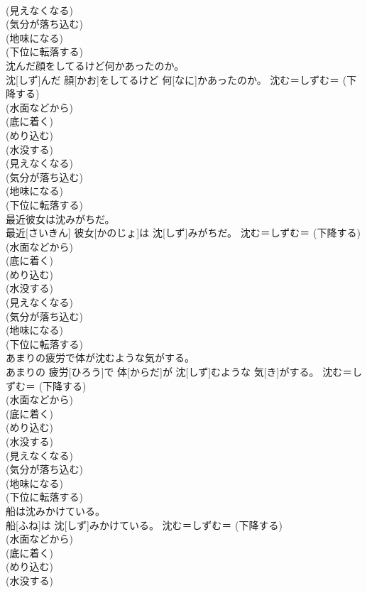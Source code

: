 \documentclass[8pt]{extreport}
\begin{document}
\begin{CJK}{UTF8}{min}
{\\	(見えなくなる) 
\\	(気分が落ち込む) 
\\	(地味になる) 
\\	(下位に転落する) 
\\	沈んだ顔をしてるけど何かあったのか。	
\\	沈[しず]んだ 顔[かお]をしてるけど 何[なに]かあったのか。	沈む＝しずむ＝ (下降する) 
\\	(水面などから) 
\\	(底に着く) 
\\	(めり込む) 
\\	(水没する) 
\\	(見えなくなる) 
\\	(気分が落ち込む) 
\\	(地味になる) 
\\	(下位に転落する) 
\\	最近彼女は沈みがちだ。	
\\	最近[さいきん] 彼女[かのじょ]は 沈[しず]みがちだ。	沈む＝しずむ＝ (下降する) 
\\	(水面などから) 
\\	(底に着く) 
\\	(めり込む) 
\\	(水没する) 
\\	(見えなくなる) 
\\	(気分が落ち込む) 
\\	(地味になる) 
\\	(下位に転落する) 
\\	あまりの疲労で体が沈むような気がする。	
\\	あまりの 疲労[ひろう]で 体[からだ]が 沈[しず]むような 気[き]がする。	沈む＝しずむ＝ (下降する) 
\\	(水面などから) 
\\	(底に着く) 
\\	(めり込む) 
\\	(水没する) 
\\	(見えなくなる) 
\\	(気分が落ち込む) 
\\	(地味になる) 
\\	(下位に転落する) 
\\	船は沈みかけている。	
\\	船[ふね]は 沈[しず]みかけている。	沈む＝しずむ＝ (下降する) 
\\	(水面などから) 
\\	(底に着く) 
\\	(めり込む) 
\\	(水没する) 
}
\end{CJK}
\end{document}
